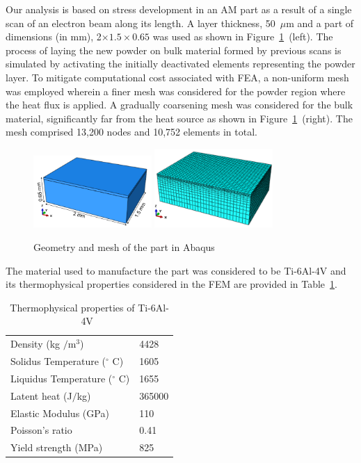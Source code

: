 Our analysis is based on stress development in an AM part as a result of a single scan of an 
electron beam along its
length. A layer thickness, 50~$\mu$m and a part of dimensions (in mm), 2$\times 1.5\times 0.65$ was used as shown
in Figure~\ref{fig:PartwMesh}~(left). 
The process of laying the new powder on bulk material formed by previous scans is simulated 
by activating the initially deactivated elements representing the powder layer. To mitigate computational cost
associated with FEA, a non-uniform mesh was employed wherein a finer mesh was considered for the powder
region where the heat flux is applied. A gradually coarsening mesh was considered for the bulk material, significantly far 
from the heat source as shown in Figure~\ref{fig:PartwMesh}~(right). The mesh comprised 13,200 nodes and 
10,752 elements in total. 
%
\begin{figure}[htbp]
\begin{center}
\includegraphics[width=0.4\textwidth]{./Figures/EBM_PartwXYZ} 
\includegraphics[width=0.4\textwidth]{./Figures/meshwXYZ}
\end{center}
\caption{Geometry and mesh of the part in Abaqus}
\label{fig:PartwMesh}
\end{figure}
%
The material used to manufacture the part was considered to be Ti-6Al-4V and its
thermophysical properties considered in the FEM are provided in Table~\ref{tab:matProp}.
%
\begin{table}[htbp]
\centering
\caption{Thermophysical properties of Ti-6Al-4V~\cite{Fu:2014}}
\label{tab:matProp}
\vspace{1mm}
\begin{tabular}{ ll }
\toprule
    Density (kg $/$m$^3$) & 4428\\
    Solidus Temperature ($^\circ$ C) & 1605 \\
    Liquidus Temperature ($^\circ$ C) & 1655\\
    Latent heat (J$/$kg) & 365000\\
    Elastic Modulus (GPa) & 110 \\
    Poisson's ratio & 0.41\\
    Yield strength (MPa) & 825\\
\bottomrule
\end{tabular}
\end{table}

